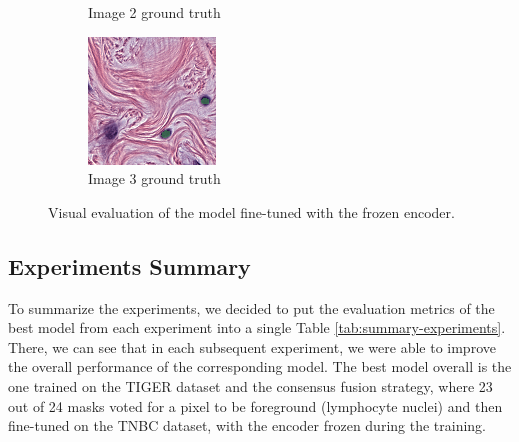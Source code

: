 \begin{figure}[H]
\begin{subfigure}[b]{0.32\textwidth}
    \caption{Image 2 ground truth}
  \end{subfigure}\hfill
  \begin{subfigure}[b]{0.32\textwidth}
    \centering
    \includegraphics[width=\linewidth]{assets/images/for_presentation/exp4-3-gt.png}
    \caption{Image 3 ground truth}
  \end{subfigure}
  \caption{Visual evaluation of the model fine-tuned with the frozen encoder.}
  \label{fig:exp4-results}
\end{figure}

\subsection{Experiments Summary}
To summarize the experiments, we decided to put the evaluation metrics of the best model from each experiment into a single Table \ref{tab:summary-experiments}. There, we can see that in each subsequent experiment, we were able to improve the overall performance of the corresponding model. The best model overall is the one trained on the TIGER dataset and the consensus fusion strategy, where 23 out of 24 masks voted for a pixel to be foreground (lymphocyte nuclei) and then fine-tuned on the TNBC dataset, with the encoder frozen during the training.

